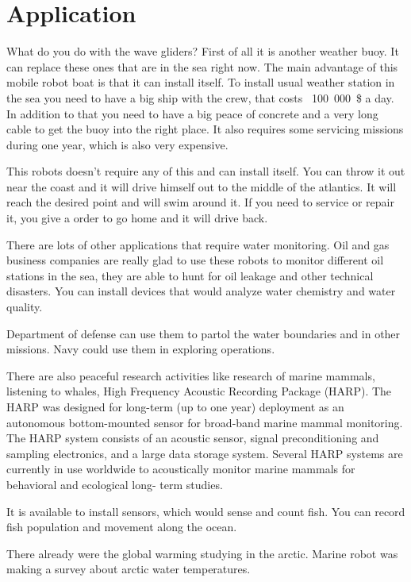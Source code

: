 \section{Application}

What do you do with the wave gliders? First of all it is another weather buoy. It can replace these ones that are in the sea right now. The main advantage of this mobile robot boat is that it can install itself. To install usual weather station in the sea you need to have a big ship with the crew, that costs \mbox{ 100 000 \$} a day. In addition to that you need to have a  big peace of concrete and a very long cable to get the buoy into the right place.  It also requires some servicing missions during one year, which is also very expensive.

This robots doesn't require any of this and can install itself. You can throw it
out near the coast and it will drive himself out to the middle of the atlantics. It will reach the desired point and will swim around it. If you need to service or repair it, you give a  order to go home and it will drive back.

There are lots of other applications that require water monitoring. Oil and gas business companies are really glad to use these robots to monitor different oil stations in the sea, they are able to hunt for oil  leakage and other technical disasters.  You can install devices that would analyze water chemistry and water quality.

Department of defense can use them to partol  the water boundaries and in other missions. Navy could use them in exploring operations.

There are also peaceful research activities like research of marine mammals, listening to whales, High Frequency  Acoustic Recording Package (HARP). The HARP was designed for long-term (up to one year) deployment as an autonomous bottom-mounted sensor for broad-band marine mammal monitoring. The HARP system consists of an acoustic sensor, signal preconditioning and sampling electronics, and a large data storage system. Several HARP systems are currently in use worldwide to acoustically monitor marine mammals for behavioral and ecological long- term studies.

It is available to install sensors, which would sense and count fish. You can record fish population and movement along the ocean.

There already were  the global warming studying in the arctic. Marine robot was making a survey about arctic water temperatures.

